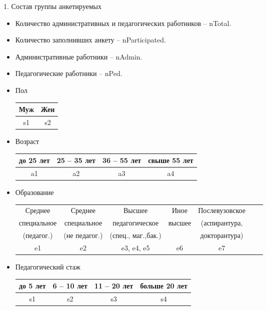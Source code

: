\begin{frame}{1.	Состав группы анкетируемых}

\tiny


\begin{itemize}
\item Количество административных и педагогических работников – nTotal.
\item Количество заполнивших анкету – nParticipated.
\item Административные работники – nAdmin.
\item Педагогические работники – nPed.
\item Пол \\
\begin{tabular}{|c|c|} \hline
Муж &  Жен \\ \hline
s1     &   s2   \\ \hline
\end{tabular}

\item Возраст \\
\noindent
\begin{tabular}{|c|c|c|c|} \hline
до 25 лет &  25 -- 35  лет &  36 -- 55 лет & свыше 55 лет \\ \hline
a1     &   a2         &   a3        & a4 \\ \hline
\end{tabular}

\item Образование

\begin{tabular}{|c|c|c|c|c|c|c|} \hline
Среднее  & Среднее  & Высшее    & Иное  & Послевузовское \\
специальное & специальное & педагогическое & высшее & (аспирантура,\\
(педагог.)       & (не педагог.)   & (спец., маг.,бак.) & &  докторантура) \\ \hline
e1 & e2 & e3, e4, e5 & e6 & e7 \\ \hline
\end{tabular}

\item Педагогический стаж \\
\noindent
\begin{tabular}{|c|c|c|c|} \hline
 до 5 лет &  6 -- 10 лет &  11 -- 20 лет & больше 20 лет \\ \hline
 s1    &   s2       &  s3         & s4 \\ \hline
\end{tabular}


\end{itemize}
\end{frame}
